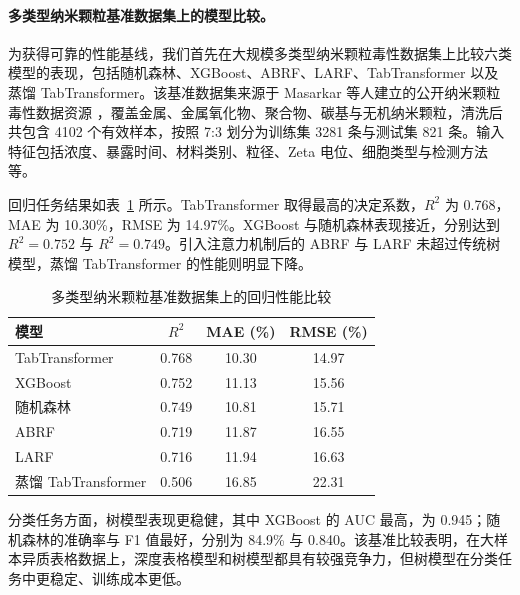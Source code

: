 \documentclass[letterpaper]{article}
\begin{document}
\paragraph{多类型纳米颗粒基准数据集上的模型比较。}
为获得可靠的性能基线，我们首先在大规模多类型纳米颗粒毒性数据集上比较六类模型的表现，包括随机森林\cite{breiman2001random}、XGBoost\cite{chen2016xgboost}、ABRF\cite{gromov2022attention}、LARF\cite{gromov2022larf}、TabTransformer\cite{huang2020tabtransformer} 以及蒸馏 TabTransformer\cite{hinton2015distilling}。该基准数据集来源于 Masarkar 等人建立的公开纳米颗粒毒性数据资源 \cite{masarkar2024}，覆盖金属、金属氧化物、聚合物、碳基与无机纳米颗粒，清洗后共包含 4102 个有效样本，按照 7:3 划分为训练集 3281 条与测试集 821 条。输入特征包括浓度、暴露时间、材料类别、粒径、Zeta 电位、细胞类型与检测方法等。

回归任务结果如表~\ref{tab:benchmark_regression} 所示。TabTransformer 取得最高的决定系数，$R^2$ 为 0.768，MAE 为 10.30\%，RMSE 为 14.97\%。XGBoost 与随机森林表现接近，分别达到 $R^2=0.752$ 与 $R^2=0.749$。引入注意力机制后的 ABRF 与 LARF 未超过传统树模型，蒸馏 TabTransformer 的性能则明显下降。

\begin{table}[htbp]
  \centering
  \caption{多类型纳米颗粒基准数据集上的回归性能比较}
  \label{tab:benchmark_regression}
  \begin{tabular}{lccc}
    \hline
    模型 & $R^2$ & MAE (\%) & RMSE (\%) \\
    \hline
    TabTransformer & 0.768 & 10.30 & 14.97 \\
    XGBoost & 0.752 & 11.13 & 15.56 \\
    随机森林 & 0.749 & 10.81 & 15.71 \\
    ABRF & 0.719 & 11.87 & 16.55 \\
    LARF & 0.716 & 11.94 & 16.63 \\
    蒸馏 TabTransformer & 0.506 & 16.85 & 22.31 \\
    \hline
  \end{tabular}
\end{table}

分类任务方面，树模型表现更稳健，其中 XGBoost 的 AUC 最高，为 0.945；随机森林的准确率与 F1 值最好，分别为 84.9\% 与 0.840。该基准比较表明，在大样本异质表格数据上，深度表格模型和树模型都具有较强竞争力，但树模型在分类任务中更稳定、训练成本更低。
\end{document}
